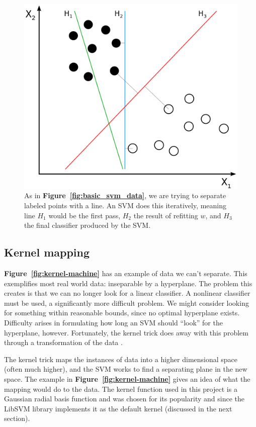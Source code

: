 \documentclass[11pt]{article} %
\begin{document}
\begin{figure}[h]
  \centering
  \includegraphics[scale=.5]{images/Svm_separating_hyperplanes.png}
  \caption{As in \textbf{Figure~\ref{fig:basic_svm_data}}, we are trying to separate
    labeled points with a line. An SVM does this iteratively, meaning line $H_1$
    would be the first pass, $H_2$ the result of refitting $w$, and $H_3$ the final 
    classifier produced by the SVM.}
  \label{fig:training_hyperplanes}
\end{figure}

\subsection{Kernel mapping}
\label{sec:kernels}
\textbf{Figure~\ref{fig:kernel-machine}} has an example of data we can't separate.
This exemplifies most real world data: inseparable by a hyperplane. The problem this
creates is that we can no longer look for a linear classifier. A nonlinear 
classifier must be used, a significantly more difficult problem. We might consider 
looking for something within reasonable bounds, since no optimal
hyperplane exists. Difficulty arises in formulating how long an SVM should ``look'' 
for the hyperplane, however. Fortunately, the kernel trick does away with this 
problem through a transformation of the data \cite{aizerman1964theoretical}.

The kernel trick maps the instances of data into a higher dimensional space 
(often much higher), and the SVM works to find a separating plane in the new 
space. The example in \textbf{Figure~\ref{fig:kernel-machine}} gives an idea
of what the mapping would do to the data. The kernel function used in this 
project is a Gaussian radial basis function and was chosen for its popularity
and since the LibSVM library implements it as the default kernel 
\cite{chang2011libsvm} (discussed in the next section). 
\end{document}
